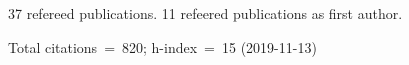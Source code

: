 37 refereed publications. 11 refeered publications as first author.

Total citations~=~820; h-index~=~15 (2019-11-13)